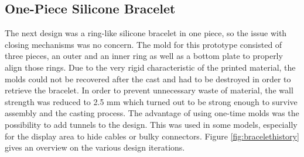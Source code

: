 \subsection{One-Piece Silicone Bracelet}
The next design was a ring-like silicone bracelet in one piece, so the issue with closing mechanisms was no concern. The mold for this prototype consisted of three pieces, an outer and an inner ring as well as a bottom plate to properly align those rings. Due to the very rigid characteristic of the printed material, the molds could not be recovered after the cast and had to be destroyed in order to retrieve the bracelet. In order to prevent unnecessary waste of material, the wall strength was reduced to 2.5 mm which turned out to be strong enough to survive assembly and the casting process. The advantage of using one-time molds was the possibility to add tunnels to the design. This was used in some models, especially for the display area to hide cables or bulky connectors. Figure \ref{fig:bracelethistory} gives an overview on the various design iterations.

